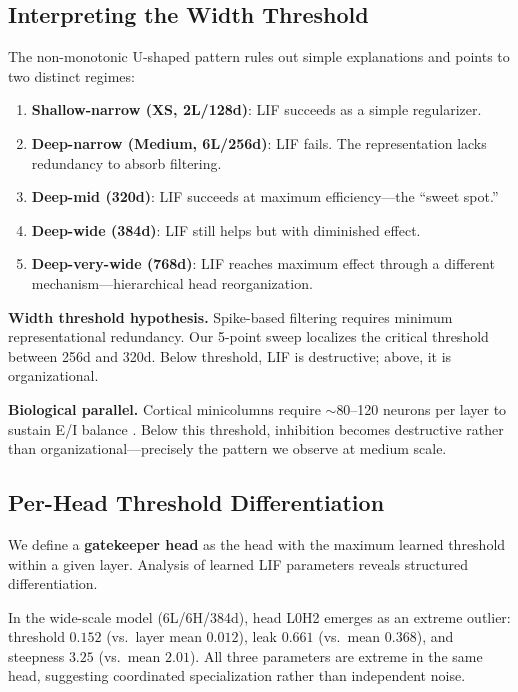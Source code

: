 \documentclass[11pt]{article}
\begin{document}
\subsection{Interpreting the Width Threshold}

The non-monotonic U-shaped pattern rules out simple explanations and points to two distinct regimes:
\begin{enumerate}
    \item \textbf{Shallow-narrow (XS, 2L/128d)}: LIF succeeds as a simple regularizer.
    \item \textbf{Deep-narrow (Medium, 6L/256d)}: LIF fails. The representation lacks redundancy to absorb filtering.
    \item \textbf{Deep-mid (320d)}: LIF succeeds at maximum efficiency---the ``sweet spot.''
    \item \textbf{Deep-wide (384d)}: LIF still helps but with diminished effect.
    \item \textbf{Deep-very-wide (768d)}: LIF reaches maximum effect through a different mechanism---hierarchical head reorganization.
\end{enumerate}

\textbf{Width threshold hypothesis.} Spike-based filtering requires minimum representational redundancy. Our 5-point sweep localizes the critical threshold between 256d and 320d. Below threshold, LIF is destructive; above, it is organizational.

\textbf{Biological parallel.} Cortical minicolumns require $\sim$80--120 neurons per layer to sustain E/I balance \cite{hensch2005critical}. Below this threshold, inhibition becomes destructive rather than organizational---precisely the pattern we observe at medium scale.

\subsection{Per-Head Threshold Differentiation}
\label{sec:threshold}

We define a \textbf{gatekeeper head} as the head with the maximum learned threshold within a given layer. Analysis of learned LIF parameters reveals structured differentiation.

In the wide-scale model (6L/6H/384d), head L0H2 emerges as an extreme outlier: threshold $0.152$ (vs.\ layer mean $0.012$), leak $0.661$ (vs.\ mean $0.368$), and steepness $3.25$ (vs.\ mean $2.01$). All three parameters are extreme in the same head, suggesting coordinated specialization rather than independent noise.
\end{document}
